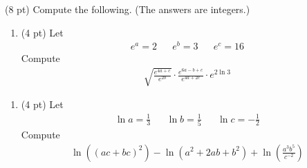 (8 pt) Compute the following. (The answers are integers.)

\begin{enumerate}[label=(\alph*)]
\item\label{itm : E1Q2a} (4 pt) Let
\begin{align*}
e^{a}
=
2
&&
e^{b}
=
3
&&
e^{c}
=
16
\end{align*}
Compute
\begin{align*}
\sqrt{\frac{e^{4 a + c}}{e^{2 b}}} \cdot \frac{e^{6 a - b + c}}{e^{4 a + 2 c}} \cdot e^{2 \ln 3}
\end{align*}
\end{enumerate}


\begin{enumerate}[resume,label=(\alph*)]
\item\label{itm : E1Q2b} (4 pt) Let
\begin{align*}
\ln a
=
\frac{1}{3}
&&
\ln b
=
\frac{1}{5}
&&
\ln c
=
-\frac{1}{2}
\end{align*}
Compute
\begin{align*}
\ln\left((a c + b c)^{2}\right) - \ln\left(a^{2} + 2 a b + b^{2}\right) + \ln\left(\frac{a^{3} b^{5}}{c^{-2}}\right)
\end{align*}
\end{enumerate}






